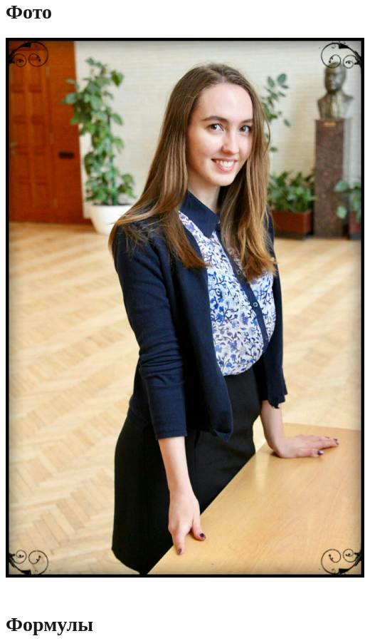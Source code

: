 \documentclass[12pt, a4paper]{article}
\begin{document}
 \section{Фото}
\includegraphics[scale=0.05]{8i3thmz0UAI}

\section{Формулы}
\end{document}
